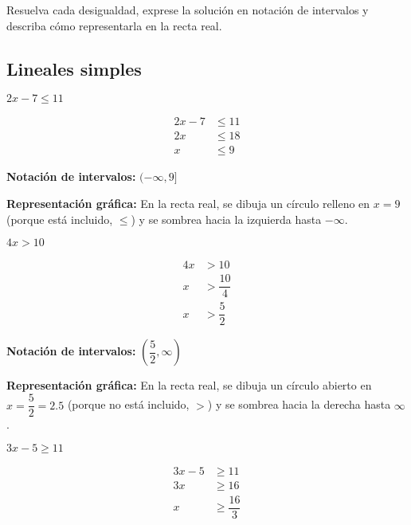\newpage
{}

Resuelva cada desigualdad, exprese la solución en notación de intervalos y describa cómo representarla en la recta real.

\vspace{-0.2cm}

\subsection*{Lineales simples}

\begin{exercise}
\problem $2x - 7 \le 11$

\begin{solucion}
\begin{align*}
2x - 7 &\le 11 \\
2x &\le 18 \\
x &\le 9
\end{align*}

\textbf{Notación de intervalos:} $(-\infty, 9]$

\textbf{Representación gráfica:} En la recta real, se dibuja un círculo relleno en $x = 9$ (porque está incluido, $\le$) y se sombrea hacia la izquierda hasta $-\infty$.
\end{solucion}

\problem $4x > 10$

\begin{solucion}
\begin{align*}
4x &> 10 \\
x &> \dfrac{10}{4} \\
x &> \dfrac{5}{2}
\end{align*}

\textbf{Notación de intervalos:} $\left(\dfrac{5}{2}, \infty\right)$

\textbf{Representación gráfica:} En la recta real, se dibuja un círculo abierto en $x = \dfrac{5}{2} = 2.5$ (porque no está incluido, $>$) y se sombrea hacia la derecha hasta $\infty$.
\end{solucion}

\problem $3x - 5 \ge 11$

\begin{solucion}
\begin{align*}
3x - 5 &\ge 11 \\
3x &\ge 16 \\
x &\ge \dfrac{16}{3}
\end{align*}


\end{solucion}
\end{exercise}
